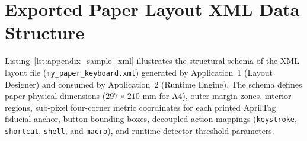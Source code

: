 \section{Exported Paper Layout XML Data Structure}
\label{sec:appendix_designer_xml}
Listing~\ref{lst:appendix_sample_xml} illustrates the structural schema of the XML layout file (\texttt{my\_paper\_keyboard.xml}) generated by Application~1 (Layout Designer) and consumed by Application~2 (Runtime Engine). The schema defines paper physical dimensions ($297 \times 210\text{ mm}$ for A4), outer margin zones, interior regions, sub-pixel four-corner metric coordinates for each printed AprilTag fiducial anchor, button bounding boxes, decoupled action mappings (\texttt{keystroke}, \texttt{shortcut}, \texttt{shell}, and \texttt{macro}), and runtime detector threshold parameters.

